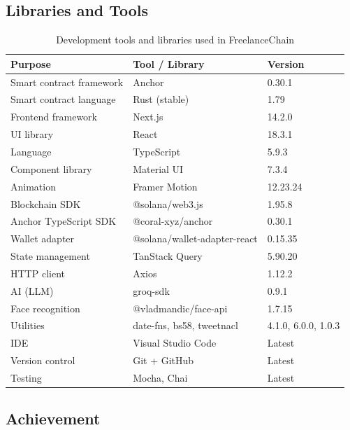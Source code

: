 \subsection{Libraries and Tools}
\label{subsection:4.3.1}

\begin{table}[H]
\centering
\caption{Development tools and libraries used in FreelanceChain}
\label{table:tools}
\begin{tabular}{|l|l|l|}
\hline
\textbf{Purpose} & \textbf{Tool / Library} & \textbf{Version} \\ \hline
Smart contract framework & Anchor & 0.30.1 \\ \hline
Smart contract language & Rust (stable) & 1.79 \\ \hline
Frontend framework & Next.js & 14.2.0 \\ \hline
UI library & React & 18.3.1 \\ \hline
Language & TypeScript & 5.9.3 \\ \hline
Component library & Material UI & 7.3.4 \\ \hline
Animation & Framer Motion & 12.23.24 \\ \hline
Blockchain SDK & @solana/web3.js & 1.95.8 \\ \hline
Anchor TypeScript SDK & @coral-xyz/anchor & 0.30.1 \\ \hline
Wallet adapter & @solana/wallet-adapter-react & 0.15.35 \\ \hline
State management & TanStack Query & 5.90.20 \\ \hline
HTTP client & Axios & 1.12.2 \\ \hline
AI (LLM) & groq-sdk & 0.9.1 \\ \hline
Face recognition & @vladmandic/face-api & 1.7.15 \\ \hline
Utilities & date-fns, bs58, tweetnacl & 4.1.0, 6.0.0, 1.0.3 \\ \hline
IDE & Visual Studio Code & Latest \\ \hline
Version control & Git + GitHub & Latest \\ \hline
Testing & Mocha, Chai & Latest \\ \hline
\end{tabular}
\end{table}

\subsection{Achievement}
\label{subsection:4.3.2}

